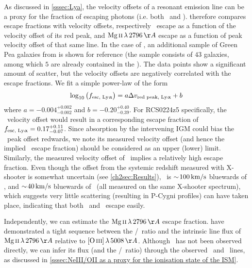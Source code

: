 As discussed in \cref{sssec:Lya}, the velocity offsets of a resonant emission line can be a proxy for the fraction of escaping photons (i.e. both \lya\ and \MgII).  therefore compares escape fractions with velocity offsets, respectively \lya\ escape as a function of the velocity offset of its red peak, and $\MgII \, \lambda \, 2796 \, \Angstrom$ escape as a function of peak velocity offset of that same line. In the case of \lya, an additional sample of Green Pea galaxies from \citet{2016ApJ...820..130Y, 2017ApJ...844..171Y} is shown for reference (the sample consists of $43$ galaxies, among which $5$ are already contained in the \Isample). The data points show a significant amount of scatter, but the velocity offsets are negatively correlated with the escape fractions. We fit a simple power-law of the form
\begin{equation}
    \log_{10} \left( f_\text{esc, {Ly\ensuremath{\upalpha}}} \right) = a \Delta v_\text{red peak, {Ly\ensuremath{\upalpha}}} + b
\end{equation}
where $a = -0.004_{-0.002}^{+0.002}$ and $b = -0.20_{-0.39}^{+0.40}$. For RCS0224z5 specifically, the \lya\ velocity offset would result in a corresponding escape fraction of $f_\text{esc, {Ly\ensuremath{\upalpha}}} = 0.17_{-0.07}^{+0.11}$. Since absorption by the intervening IGM could bias the \lya\ peak offset redwards, we note its measured velocity offset (and hence the implied \lya\ escape fraction) should be considered as an upper (lower) limit. Similarly, the measured velocity offset of \MgII\ implies a relatively high escape fraction. Even though the offset from the systemic redshift measured with X-shooter is somewhat uncertain (see \cref{ch2sec:Results}), \MgII\ is $\sim \! 100 \, \mathrm{km/s}$ bluewards of \lya, and $\sim \! 40 \, \mathrm{km/s}$ bluewards of \CIV\ (all measured on the same X-shooter spectrum), which suggests very little scattering (resulting in P-Cygni profiles) can have taken place, indicating that both \lya\ and \MgII\ escape easily.

Independently, we can estimate the $\MgII \, \lambda \, 2796 \, \Angstrom$ escape fraction. \citet{2018ApJ...855...96H} have demonstrated a tight sequence between the \OIIIf/\OII\ ratio and the intrinsic line flux of $\MgII \, \lambda \, 2796 \, \Angstrom$ relative to $\OIIIf \, \lambda \, 5008 \, \Angstrom$. Although \OIIIf\ has not been observed directly, we can infer its flux (and the \OIIIf/\OII\ ratio) through the observed \NeIII\ and \OII\ lines, as discussed in \cref{sssec:NeIII/OII as a proxy for the ionisation state of the ISM}.

